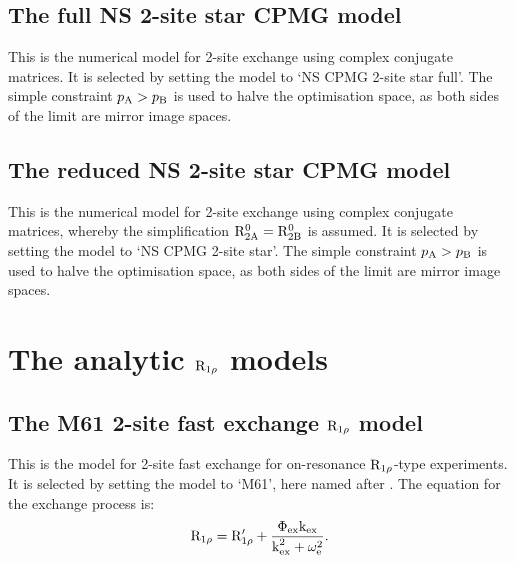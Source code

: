 
\subsection{The full NS 2-site star CPMG model}
\label{sect: dispersion: NS CPMG 2-site star full model}

This is the numerical model for 2-site exchange using complex conjugate matrices.
It is selected by setting the model to `NS CPMG 2-site star full'.
The simple constraint $p_\textrm{A} > p_\textrm{B}$ is used to halve the optimisation space, as both sides of the limit are mirror image spaces.



\subsection{The reduced NS 2-site star CPMG model}
\label{sect: dispersion: NS CPMG 2-site star model}

This is the numerical model for 2-site exchange using complex conjugate matrices, whereby the simplification $\mathrm{R}_\mathrm{2A}^0 = \mathrm{R}_\mathrm{2B}^0$ is assumed.
It is selected by setting the model to `NS CPMG 2-site star'.
The simple constraint $p_\textrm{A} > p_\textrm{B}$ is used to halve the optimisation space, as both sides of the limit are mirror image spaces.




\section{The analytic $\mathrm{R}_{1\rho}$ models}
\label{sect: dispersion: analytic R1rho models}



\subsection{The M61 2-site fast exchange $\mathrm{R}_{1\rho}$ model}
\label{sect: dispersion: M61 model}

This is the model for 2-site fast exchange for on-resonance $\mathrm{R}_{1\rho}$-type experiments.  It is selected by setting the model to `M61', here named after \citet{Meiboom61}.  The equation for the exchange process is:
\begin{equation}
    \mathrm{R}_{1\rho} = \mathrm{R}_{1\rho}' + \frac{\Phi_\textrm{ex}\textrm{k}_\textrm{ex}}{\textrm{k}_\textrm{ex}^2 + \omega_\textrm{e}^2} .
\end{equation}

